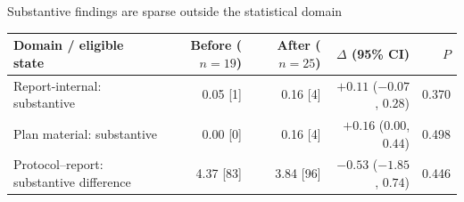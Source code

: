\documentclass[10pt,aspectratio=169]{beamer}
\begin{document}
\begin{frame}[t]{Substantive findings are sparse outside the statistical domain}
\small
\begin{tabularx}{\linewidth}{@{}Yrrrr@{}}
\toprule
Domain / eligible state & Before ($n=19$) & After ($n=25$) & $\Delta$ (95\% CI) & $P$ \\
\midrule
Report-internal: substantive & 0.05 [1] & 0.16 [4] & $+0.11$ ($-0.07$, $0.28$) & 0.370 \\
Plan material: substantive & 0.00 [0] & 0.16 [4] & $+0.16$ ($0.00$, $0.44$) & 0.498 \\
Protocol--report: substantive difference & 4.37 [83] & 3.84 [96] & $-0.53$ ($-1.85$, $0.74$) & 0.446 \\
\bottomrule
\end{tabularx}


\end{frame}
\end{document}
